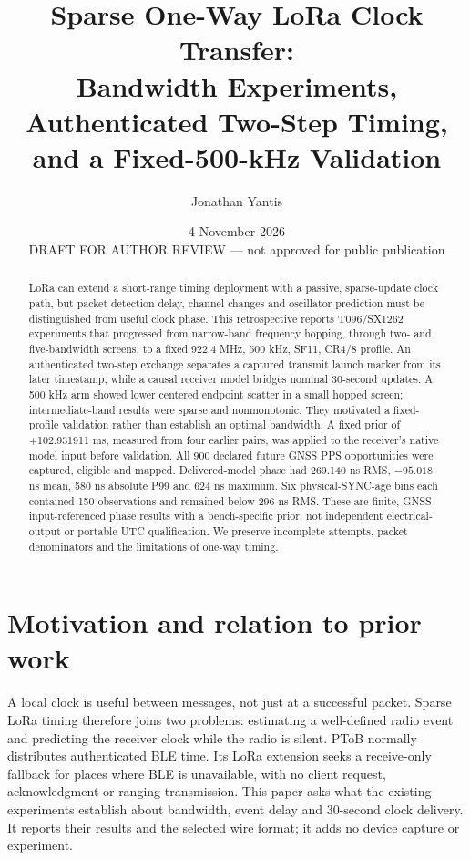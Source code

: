 \documentclass[10pt,letterpaper]{article}
\title{\vspace{-1.8em}Sparse One-Way LoRa Clock Transfer:\\Bandwidth Experiments, Authenticated Two-Step Timing,\\and a Fixed-500-kHz Validation}
\author{Jonathan Yantis}
\date{4 November 2026\\\small DRAFT FOR AUTHOR REVIEW --- not approved for public publication}
\begin{document}
\maketitle\thispagestyle{empty}\vspace{-1.1em}
\begin{abstract}
LoRa can extend a short-range timing deployment with a passive, sparse-update
clock path, but packet detection delay, channel changes and oscillator prediction
must be distinguished from useful clock phase. This retrospective reports
T096/SX1262 experiments that progressed from narrow-band frequency hopping,
through two- and five-bandwidth screens, to a fixed 922.4 MHz, 500 kHz,
SF11, CR4/8 profile. An authenticated two-step exchange separates a captured
transmit launch marker from its later timestamp, while a causal receiver model
bridges nominal 30-second updates. A 500 kHz arm showed lower centered endpoint
scatter in a small hopped screen; intermediate-band results were sparse and
nonmonotonic. They motivated a fixed-profile validation rather than establish
an optimal bandwidth. A fixed prior of +102.931911 ms, measured from four earlier
pairs, was applied to the receiver's native model input before validation.
All 900 declared future GNSS PPS opportunities were captured, eligible and
mapped. Delivered-model phase had 269.140 ns RMS, $-95.018$ ns mean, 580 ns
absolute P99 and 624 ns maximum. Six physical-SYNC-age bins each contained
150 observations and remained below 296 ns RMS. These are finite,
GNSS-input-referenced phase results with a bench-specific prior, not independent
electrical-output or portable UTC qualification. We preserve incomplete
attempts, packet denominators and the limitations of one-way timing.
\end{abstract}
\vspace{-0.4em}
\section{Motivation and relation to prior work}
A local clock is useful between messages, not just at a successful packet.
Sparse LoRa timing therefore joins two problems: estimating a well-defined
radio event and predicting the receiver clock while the radio is silent.
PToB normally distributes authenticated BLE time. Its LoRa extension seeks a
receive-only fallback for places where BLE is unavailable, with no client
request, acknowledgment or ranging transmission. This paper asks what the
existing experiments establish about bandwidth, event delay and 30-second
clock delivery. It reports their results and the selected wire format; it adds
no device capture or experiment.
\end{document}
